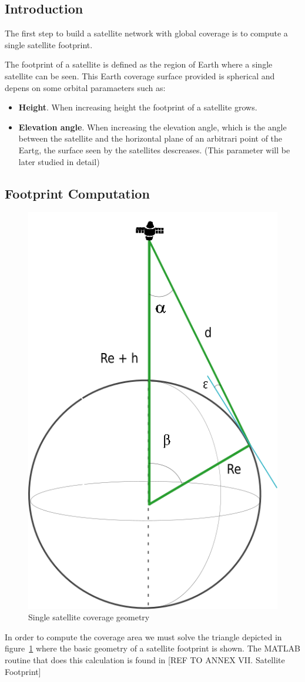 \subsection{Introduction}

The first step to build a satellite network with global coverage is to compute a single satellite footprint.

The footprint of a satellite is defined as the region of Earth where a single satellite can be seen. This Earth coverage surface provided is spherical and depens on some orbital paramaeters such as:

\begin{itemize}
\item \textbf{Height}. When increasing height the footprint of a satellite grows.
\item \textbf{Elevation angle}. When increasing the elevation angle, which is the angle between the satellite and the horizontal plane of an arbitrari point of the Eartg, the surface seen by the satellites descreases. (This parameter will be later studied in detail)
\end{itemize}

\subsection{Footprint Computation}
 
\begin{figure}[H] %
	\centering
	\includegraphics[width=.3\textwidth]{./fig-Ch2-OrbitalCoverage/AngleSSatFoot.png}
	\caption{Single satellite coverage geometry}
	\label{fig:AngleSSatFoot}
\end{figure}

In order to compute the coverage area we must solve the triangle depicted in figure~\ref{fig:AngleSSatFoot} where the basic geometry of a satellite footprint is shown. The MATLAB routine that does this calculation is found in [{REF TO ANNEX VII. Satellite Footprint}]

